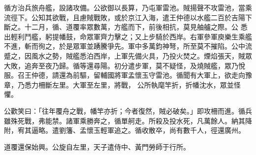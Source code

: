\begin{pinyinscope}
 循方治兵旅舟艦，設諸攻備。公欲御以長算，乃屯軍雷池。賊揚聲不攻雷池，當乘流徑下。公知其欲戰，且慮賊戰敗，或於京江入海，遣王仲德以水艦二百於吉陽下斷之。十二月，循、道覆率眾數萬，方艦而下，前後相抗，莫見舳艫之際。公
 悉出輕利鬥艦，躬提幡鼓，命眾軍齊力擊之；又上步騎於西岸。右軍參軍庾樂生乘艦不進，斬而徇之，於是眾軍並踴騰爭先。軍中多萬鈞神弩，所至莫不摧陷。公中流蹙之，因風水之勢，賊艦悉泊西岸，上軍先備火具，乃投火焚之。煙焰張天，賊眾大敗，追奔至夜乃歸。循等還尋陽。初分遣步軍，莫不疑怪，及燒賊艦，眾乃悅服。召王仲德，請還為前驅，留輔國將軍孟懷玉守雷池。循聞有大軍上，欲走向豫章，乃悉力柵斷左里。大軍至左里，將戰，
 公所執麾竿折，折幡沈水，眾並怪懼。



 公歡笑曰：「往年覆舟之戰，幡竿亦折；今者復然，賊必破矣。」即攻柵而進。循兵雖殊死戰，弗能禁。諸軍乘勝奔之，循單舸走。所殺及投水死，凡萬餘人。納其降附，宥其逼略。遣劉籓、孟懷玉輕軍追之。循收散卒，尚有數千人，徑還廣州。



 道覆還保始興。公旋自左里，天子遣侍中、黃門勞師于行所。






\end{pinyinscope}